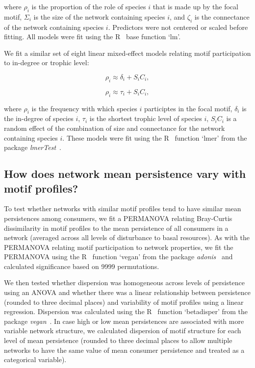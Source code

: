 \documentclass[12pt]{article}
\begin{document}
\begin{spacing}{2.0}
        where $\rho_{i}$ is the proportion of the role of species $i$ that is made up by the focal motif,
        $\Sigma_{i}$ is the size of the network containing species $i$, and $\zeta_{i}$ is the connectance of the network containing species $i$.
        Predictors were not centered or scaled before fitting.
        All models were fit using the R~\citep{R} base function `lm'.

       
        We fit a similar set of eight linear mixed-effect models relating motif participation to in-degree or trophic level:
        
        \begin{equation}
            \rho_{i} \approx \delta_{i} + S_{i}C_{i} ,
            \label{partic_deg}
        \end{equation}

        \begin{equation}
            \rho_{i} \approx \tau_{i} + S_{i}C_{i} ,
            \label{partic_deg}
        \end{equation}
        
        where $\rho_{i}$ is the frequency with which species $i$ participtes in the focal motif, $\delta_{i}$ is the in-degree of species $i$, $\tau_{i}$ is the shortest trophic level of species $i$, $S_{i}C_{i}$ is a random effect of the combination of size and connectance for the network containing species $i$.
        These models were fit using the R~\citep{R} function `lmer' from the package \emph{lmerTest}~\citep{lmerTest}.

    		
    \subsection{How does network mean persistence vary with motif profiles?}

        To test whether networks with similar motif profiles tend to have similar mean persistences among consumers, we fit a PERMANOVA relating Bray-Curtis dissimilarity in motif profiles to the mean persistence of all consumers in a network (averaged across all levels of disturbance to basal resources).
        As with the PERMANOVA relating motif participation to network properties, we fit the PERMANOVA using the R~\citep{R} function `vegan' from the package \emph{adonis}~\citep{adonis} and calculated significance based on 9999 permutations.


        We then tested whether dispersion was homogeneous across levels of persistence using an ANOVA and whether there was a linear relationship between persistence (rounded to three decimal places) and variability of motif profiles using a linear regression.
        Dispersion was calculated using the R~\citep{R} function `betadisper' from the package \emph{vegan}~\citep{vegan}.
        In case high or low mean persistences are associated with more variable network structure, we calculated dispersion of motif structure for each level of mean persistence (rounded to three decimal places to allow multiple networks to have the same value of mean consumer persistence and treated as a categorical variable). 


\end{spacing}
\end{document}

